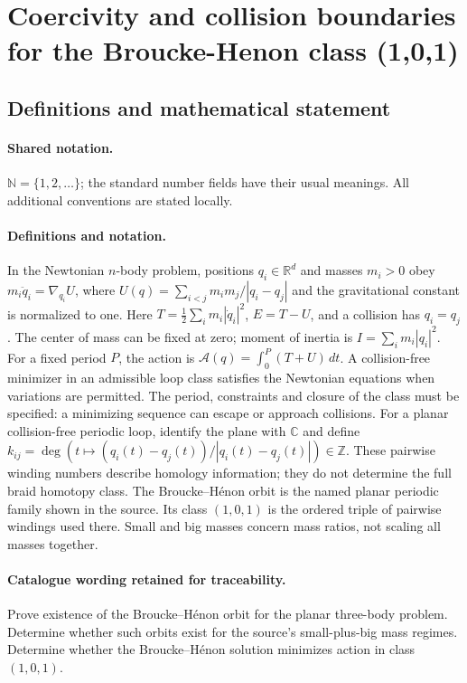 \documentclass[11pt]{article}
\begin{document}
\section{Coercivity and collision boundaries for the Broucke-Henon class (1,0,1)}\label{statement}

\subsection{Definitions and mathematical statement}

\paragraph{Shared notation.}$\mathbb N=\{1,2,\ldots\}$; the standard number fields have their usual meanings. All additional conventions are stated locally.


\paragraph{Definitions and notation.}In the Newtonian $n$-body problem, positions $q_i\in\mathbb R^d$ and masses $m_i>0$ obey $m_i\ddot q_i=\nabla_{q_i}U$, where $U(q)=\sum_{i<j}m_im_j/|q_i-q_j|$ and the gravitational constant is normalized to one. Here $T=\tfrac12\sum_i m_i|\dot q_i|^2$, $E=T-U$, and a collision has $q_i=q_j$. The center of mass can be fixed at zero; moment of inertia is $I=\sum_i m_i|q_i|^2$. For a fixed period $P$, the action is $\mathcal A(q)=\int_0^P(T+U)\,dt$. A collision-free minimizer in an admissible loop class satisfies the Newtonian equations when variations are permitted. The period, constraints and closure of the class must be specified: a minimizing sequence can escape or approach collisions. For a planar collision-free periodic loop, identify the plane with $\mathbb C$ and define $k_{ij}=\deg(t\mapsto(q_i(t)-q_j(t))/|q_i(t)-q_j(t)|)\in\mathbb Z$. These pairwise winding numbers describe homology information; they do not determine the full braid homotopy class. The Broucke--Hénon orbit is the named planar periodic family shown in the source. Its class $(1,0,1)$ is the ordered triple of pairwise windings used there. Small and big masses concern mass ratios, not scaling all masses together.

\paragraph{Catalogue wording retained for traceability.}
Prove existence of the Broucke--Hénon orbit for the planar three-body problem. Determine whether such orbits exist for the source’s small-plus-big mass regimes. Determine whether the Broucke--Hénon solution minimizes action in class $(1,0,1)$.
\end{document}
